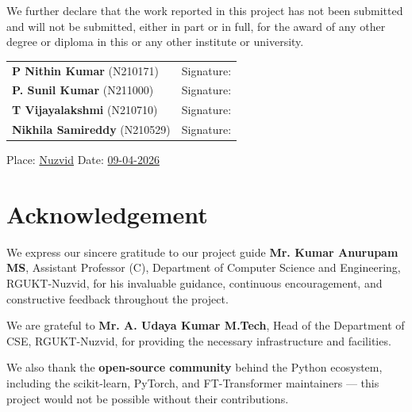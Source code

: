 \documentclass[12pt,a4paper]{report}
\begin{document}
We further declare that the work reported in this project has not been submitted and will not be submitted, either in part or in full, for the award of any other degree or diploma in this or any other institute or university.

\vspace{2cm}
\noindent
\renewcommand{\arraystretch}{1.7}
\begin{tabular}{@{}p{6.5cm}p{6.5cm}@{}}
  \textbf{P Nithin Kumar} (N210171)      & Signature: \underline{\hspace{3.5cm}} \\
  \textbf{P. Sunil Kumar} (N211000)      & Signature: \underline{\hspace{3.5cm}} \\
  \textbf{T Vijayalakshmi} (N210710)     & Signature: \underline{\hspace{3.5cm}} \\
  \textbf{Nikhila Samireddy} (N210529)   & Signature: \underline{\hspace{3.5cm}} \\
\end{tabular}

\vspace{1cm}
\noindent Place: \underline{\hspace{0.15cm}Nuzvid} \qquad Date:  \underline{\hspace{0.10cm} 09-04-2026}

\chapter*{Acknowledgement}
\thispagestyle{fancy}

We express our sincere gratitude to our project guide \textbf{Mr. Kumar Anurupam MS}, Assistant Professor (C), Department of Computer Science and Engineering, RGUKT-Nuzvid, for his invaluable guidance, continuous encouragement, and constructive feedback throughout the project.

We are grateful to \textbf{Mr. A. Udaya Kumar M.Tech}, Head of the Department of CSE, RGUKT-Nuzvid, for providing the necessary infrastructure and facilities.

We also thank the \textbf{open-source community} behind the Python ecosystem, including the scikit-learn, PyTorch, and FT-Transformer maintainers — this project would not be possible without their contributions.
\end{document}
